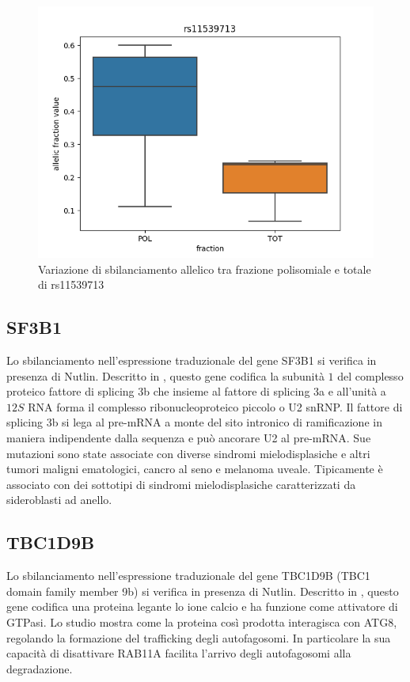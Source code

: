 \begin{multicols}{2}
\begin{figure}[H]
  \centering
  \includegraphics[scale=0.5]{shDHX30_DMSO_rs11539713.png}
  \caption{Variazione di sbilanciamento allelico tra frazione polisomiale e totale di rs11539713}
  \label{fig:KIF5B}
\end{figure}

\end{multicols}

	\subsection{SF3B1}
	Lo sbilanciamento nell'espressione traduzionale del gene SF3B1 si verifica in presenza di Nutlin.
	Descritto in \cite{sf3b1}, questo gene codifica la subunit\`a $1$ del complesso proteico fattore di splicing 3b che insieme al fattore di splicing 3a e all'unit\`a a $12S$ RNA forma il complesso ribonucleoproteico piccolo o U2 snRNP.
	Il fattore di splicing 3b si lega al pre-mRNA a monte del sito intronico di ramificazione in maniera indipendente dalla sequenza e pu\`o ancorare U2 al pre-mRNA.
	Sue mutazioni sono state associate con diverse sindromi mielodisplasiche e altri tumori maligni ematologici, cancro al seno e melanoma uveale.
	Tipicamente \`e associato con dei sottotipi di sindromi mielodisplasiche caratterizzati da sideroblasti ad anello.

	\subsection{TBC1D9B}
	Lo sbilanciamento nell'espressione traduzionale del gene TBC1D9B (TBC1 domain family member 9b) si verifica in presenza di Nutlin.
	Descritto in \cite{tbc1d9b}, questo gene codifica una proteina legante lo ione calcio e ha funzione come attivatore di GTPasi.
	Lo studio \cite{atf8} mostra come la proteina cos\`i prodotta interagisca con ATG8, regolando la formazione del trafficking degli autofagosomi.
	In particolare la sua capacit\`a di disattivare RAB11A facilita l'arrivo degli autofagosomi alla degradazione.

